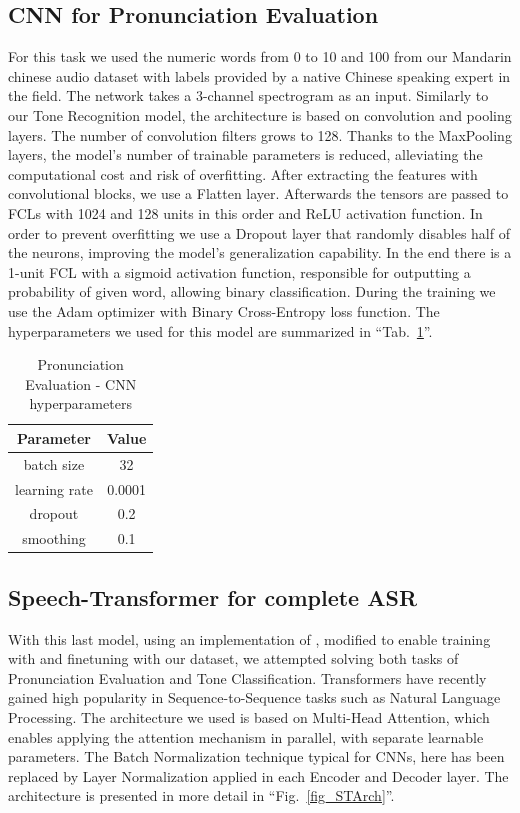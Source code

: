 \documentclass[conference]{IEEEtran}
\begin{document}
\subsection{CNN for Pronunciation Evaluation}
For this task we used the numeric words from 0 to 10 and 100 from our Mandarin chinese audio dataset with labels provided by a native Chinese speaking expert in the field. The network takes a 3-channel spectrogram as an input. Similarly to our Tone Recognition model, the architecture is based on convolution and pooling layers.
The number of convolution filters grows to 128. Thanks to the MaxPooling layers, the model's number of trainable parameters is reduced, alleviating the computational cost and risk of overfitting. After extracting the features with convolutional blocks, we use a Flatten layer.
Afterwards the tensors are passed to FCLs with 1024 and 128 units in this order and ReLU activation function. In order to prevent overfitting we use a Dropout layer that randomly disables half of the neurons, improving the model's generalization capability.
In the end there is a 1-unit FCL with a sigmoid activation function, responsible for outputting a probability of given word, allowing binary classification. During the training we use the Adam optimizer \cite{Kingma2014AdamAM} with Binary Cross-Entropy loss function.
The hyperparameters we used for this model are summarized in ``Tab.~\ref{tab_CNNPE_hyper}''.

\begin{table}[hbtp]
    \caption{Pronunciation Evaluation - CNN hyperparameters}
    \begin{center}
    \begin{tabular}{|c|c|}
    \hline
    \textbf{Parameter} & {\textbf{Value}} \\
    \hline
    batch size & 32 \\
    \hline
    learning rate & 0.0001 \\
    \hline
    dropout & 0.2 \\
    \hline
    smoothing & 0.1 \\
    \hline
    \end{tabular}
    \label{tab_CNNPE_hyper}
    \end{center}
    \end{table}

\subsection{Speech-Transformer for complete ASR}
With this last model, using an implementation of \cite{vaswani2023attentionneed,8462506}, modified to enable training with \cite{shi2021aishell3multispeakermandarintts} and finetuning with our dataset, we attempted solving both tasks of Pronunciation Evaluation and Tone Classification.
Transformers have recently gained high popularity in Sequence-to-Sequence tasks such as Natural Language Processing. The architecture we used is based on Multi-Head Attention, which enables applying the attention mechanism in parallel, with separate learnable parameters. The Batch Normalization technique typical for CNNs, here has been replaced by Layer Normalization applied in each Encoder and Decoder layer.
The architecture is presented in more detail in ``Fig.~\ref{fig_STArch}''.
\end{document}
